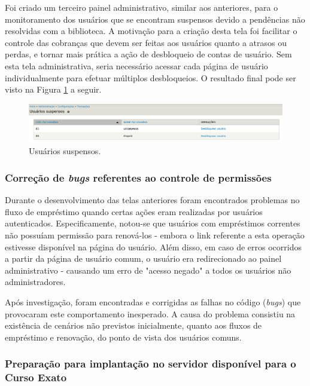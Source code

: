 \documentclass[a4paper]{article}
\begin{document}
Foi criado um terceiro painel administrativo, similar aos anteriores, para o monitoramento dos usuários que se encontram suspensos devido a pendências não resolvidas com a biblioteca. A motivação para a criação desta tela foi facilitar o controle das cobranças que devem ser feitas aos usuários quanto a atrasos ou perdas, e tornar mais prática a ação de desbloqueio de contas de usuário. Sem esta tela administrativa, seria necessário acessar cada página de usuário individualmente para efetuar múltiplos desbloqueios. O resultado final pode ser visto na Figura \ref{suspended-users} a seguir.

\begin{figure}[pbth!]
\centering
\includegraphics[width=120mm]{img/suspended-users.png}
\caption{Usuários suspensos.\label{suspended-users}}
\end{figure}

\subsubsection{Correção de \textit{bugs} referentes ao controle de permissões}
    
Durante o desenvolvimento das telas anteriores foram encontrados problemas no fluxo de empréstimo quando certas ações eram realizadas por usuários autenticados. Especificamente, notou-se que usuários com empréstimos correntes não possuíam permissão para renová-los - embora o link referente a esta operação estivesse disponível na página do usuário. Além disso, em caso de erros ocorridos a partir da página de usuário comum, o usuário era redirecionado ao painel administrativo - causando um erro de "acesso negado" a todos os usuários não administradores.

Após investigação, foram encontradas e corrigidas as falhas no código (\textit{bugs}) que provocaram este comportamento inesperado. A causa do problema consistiu na existência de cenários não previstos inicialmente, quanto aos fluxos de empréstimo e renovação, do ponto de vista dos usuários comuns.

\subsubsection{Preparação para implantação no servidor disponível para o Curso Exato}
\end{document}
